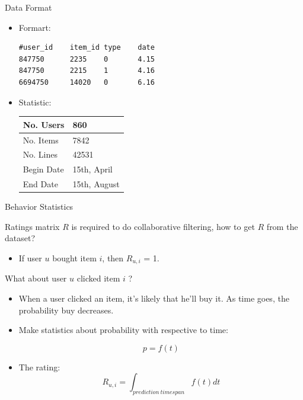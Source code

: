 \documentclass{beamer}
\begin{document}
\begin{frame}[fragile]{Data Format}

\begin{itemize}
\item Formart:

\begin{lstlisting}
#user_id    item_id type    date
847750      2235    0       4.15
847750      2215    1       4.16
6694750     14020   0       6.16
\end{lstlisting}
\item Statistic:

\begin{table}[!h]
\centering
\begin{tabular}{|l|l|}
\hline
No. Users & 860 \\ \hline
No. Items & 7842 \\ \hline
No. Lines & 42531 \\ \hline
Begin Date & 15th, April\\ \hline
End Date & 15th, August\\ \hline
\end{tabular}
\end{table}

\end{itemize}

\end{frame}


\begin{frame}{Behavior Statistics}

Ratings matrix $R$ is required to do collaborative filtering, how to get $R$ from the dataset?

\begin{itemize}
\item If user $u$ bought item $i$, then $R_{u,i}$ = 1.
\end{itemize}

\begin{alertblock}{What about user $u$ clicked item $i$ ?}
\begin{itemize}
\item When a user clicked an item, it's likely that he'll buy it. As time goes, the probability buy decreases.
\item Make statistics about probability with respective to time:

    \begin{equation}
    p = f(t)
    \end{equation}

\item The rating:
    \begin{equation}
    R_{u,i} = \int_{prediction~timespan}f(t)dt
    \end{equation}

\end{itemize}
\end{alertblock}

\end{frame}
\end{document}
